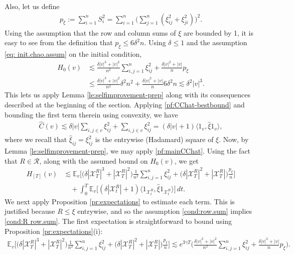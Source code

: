 \documentclass[11pt,reqno]{amsart}
\numberwithin{equation}{section}
\theoremstyle{definition}
\def\CC{{C}}
\def\E{{\mathbb E}}
\def\X{{\mathcal X}}
\begin{document}
Also, let us define
\begin{align}
p_\xi :=	\sum_{i=1}^n S_i^2   = \sum_{i=1}^n\bigg(\sum_{j=1}^n (\xi_{ij}^2 +\xi_{ji}^2)\bigg)^2.
\end{align}
Using the assumption that the row and column sums of $\xi$ are bounded by 1, it is easy to see from the definition  that $p_\xi \le 6\delta^2n$. Using $\delta \le 1$ and the assumption \eqref{eq: init.chao.assum} on the initial condition,
\begin{align*}
H_0(v) &\lesssim \frac{\delta |v|^3+|v|^2}{n^2}\sum_{i,j=1}^n\xi_{ij}^2 + \frac{\delta |v|^2 + |v|}{n}p_\xi \\
		&\le \frac{\delta |v|^3+|v|^2}{n^2} \delta^2 n^2  + \frac{\delta |v|^2 + |v|}{n} 6\delta^2 n \lesssim \delta^2|v|^3 .
\end{align*}
This lets us apply Lemma \ref{le:selfimprovement-prep} along with its consequences described at the beginning of the section. Applying \eqref{pf:CChat-bestbound} and bounding the first term therein using convexity, we have
\begin{align*}
\widehat{\CC}(v) \lesssim \delta |v| \sum_{i,j \in v} \xi_{ij}^2 +   \sum_{i,j \in v} \xi_{ij}^2 = (\delta |v|+1) \langle 1_v, \widehat{\xi} 1_v\rangle,
\end{align*}
where we recall that $\widehat{\xi}_{ij}=\xi_{ij}^2$ is the entrywise (Hadamard) square of $\xi$.
Now, by Lemma \ref{le:selfimprovement-prep}, we may apply \eqref{pf:mainCChat}. Using the fact that $R \in \mathcal{R}$,  along with the assumed bound on $H_0(v)$, we get
\begin{equation}
\begin{split}
H_{[T]}(v) & \lesssim \E_v\Big[ \big(\delta |\X_T^{R}|^3+|\X_T^{R}|^2\big)\frac{1}{n^2}\sum_{i,j=1}^n\xi_{ij}^2 + \big(\delta |\X_T^{R}|^2 + |\X_T^{R}|\big)\frac{p_\xi}{n}\Big] \\
	&\quad + \int_0^T \E_v\big[(\delta |\X_t^{R}|+1) \langle 1_{\X_t^{R}}, \widehat{\xi} 1_{\X_t^{R}}\rangle  \big]\,dt.
\end{split} \label{pf:avg-main1}
\end{equation}
We next apply Proposition \ref{pr:expectations} to estimate each term. This is justified because $R \le \xi$ entrywise, and so the assumption \eqref{cond:row.sum} implies \eqref{cond:R row.sum}. The first expectation is straightforward to bound using Proposition \ref{pr:expectations}(i):
\begin{align*}
\E_v\Big[\big(\delta |\X_T^{R}|^3+|\X_T^{R}|^2\big)\frac{1}{n^2}\sum_{i,j=1}^n\xi_{ij}^2 + \big(\delta |\X_T^{R}|^2 + |\X_T^{R}|\big)\frac{p_\xi}{n}\Big] \lesssim e^{3\gamma T}\bigg(\frac{\delta|v|^3 + |v|^2}{n^2}\sum_{i,j=1}^n\xi_{ij}^2 + \frac{\delta|v|^2+|v|}{n}p_\xi \bigg).
\end{align*}
\end{document}
